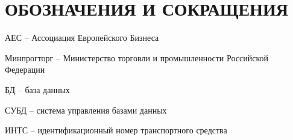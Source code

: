 \chapter*{ОБОЗНАЧЕНИЯ И СОКРАЩЕНИЯ}

АЕС -- Ассоциация Европейского Бизнеса

Минпрогторг -- Министерство торговли и промышленности Российской Федерации

БД -- база данных

СУБД -- система управления базами данных

ИНТС -- идентификационный номер транспортного средства
